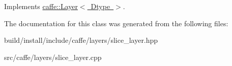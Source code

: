 Implements \mbox{\hyperlink{classcaffe_1_1_layer_a7fe981e8af8d93d587acf2a952be563d}{caffe\+::\+Layer$<$ Dtype $>$}}.



The documentation for this class was generated from the following files\+:\begin{DoxyCompactItemize}
\item 
build/install/include/caffe/layers/slice\+\_\+layer.\+hpp\item 
src/caffe/layers/slice\+\_\+layer.\+cpp\end{DoxyCompactItemize}

